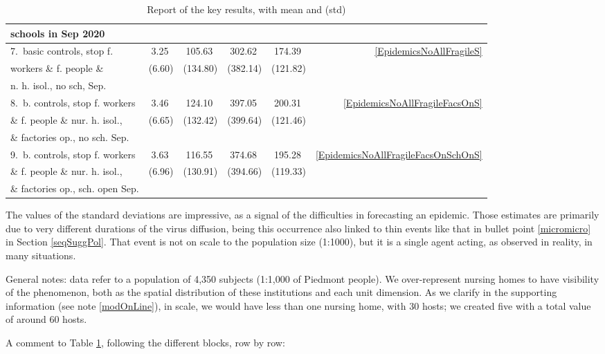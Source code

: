 \documentclass[11pt]{article}
\begin{document}
\begin{table}[H]
\begin{tabular}{lrrrrr}
 schools in Sep 2020   \\
\midrule
7.~basic controls, stop f.       &       3.25~      &   105.63~    &     302.62~          &  174.39~     & \ref{EpidemicsNoAllFragileS} \\
 workers \&  f. people \&   &       (6.60)      &   (134.80)   &     (382.14)          &  (121.82) \\
 n. h. isol., no sch, Sep.        \\
 \midrule
8.~b. controls, stop f. workers  &     3.46~     &  124.10~    &    397.05~           &  200.31~     & \ref{EpidemicsNoAllFragileFacsOnS} \\
 \&  f. people \& nur. h. isol.,  &  (6.65)       &  (132.42)   &    (399.64)           &  (121.46) \\
 \& factories op., no sch. Sep. \\
\midrule
9.~b. controls, stop f. workers  &     3.63~     &  116.55~   &    374.68~           &  195.28~     & \ref{EpidemicsNoAllFragileFacsOnSchOnS} \\
 \&  f. people \& nur. h. isol.,  &   (6.96)      &  (130.91) &     (394.66)           &  (119.33) \\
 \& factories op., sch. open Sep. \\
\bottomrule
\end{tabular}

\caption{Report of the key results, with mean and (std)}
\label{keyResultsT}
\end{table}

The values of the standard deviations are impressive, as a signal of the difficulties in forecasting an epidemic. Those estimates are primarily due to very different durations of the virus diffusion, being this occurrence also linked to thin events like that in bullet point \ref{micromicro} in Section  \ref{seqSuggPol}. That event is not on scale to the population size (1:1000), but it is a single agent acting, as observed in reality, in many situations.

General notes: data refer to a population of 4,350 subjects (1:1,000 of Piedmont people). We over-represent nursing homes to have visibility of the phenomenon, both as the spatial distribution of these institutions and each unit dimension. As we clarify in the supporting information (see note \ref{modOnLine}), in scale, we would have less than one nursing home, with 30 hosts; we created five with a total value of around 60 hosts.

A comment to Table \ref{keyResultsT}, following the different blocks, row by row:
\end{document}
